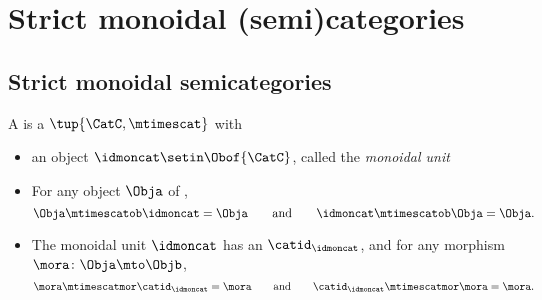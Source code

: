 
\section{Strict monoidal (semi)categories}

\subsection{Strict monoidal semicategories}

\begin{ctdefinition}
    \label{def:strict-monoidal-semicat}
    A  is a  $\tup{\CatC, \mtimescat}$ with

    \constit

    \begin{itemize}
        \item an object $\idmoncat \setin \Obof{\CatC}$, called the \emph{monoidal unit}
    \end{itemize}

    \condit

    \begin{itemize}
        \item For any object $\Obja$ of \CatC,
              \begin{equation}
                  \Obja \mtimescatob \idmoncat = \Obja \qquad \text{and} \qquad \idmoncat \mtimescatob \Obja = \Obja.
              \end{equation}
        \item The monoidal unit $\idmoncat$ has an  $\catid_\idmoncat$, and for any morphism $\mora \colon \Obja \mto \Objb$,
              \begin{equation}
                  \mora \mtimescatmor \catid_\idmoncat = \mora \qquad \text{and} \qquad \catid_\idmoncat \mtimescatmor  \mora = \mora.
              \end{equation}
    \end{itemize}

\end{ctdefinition}

